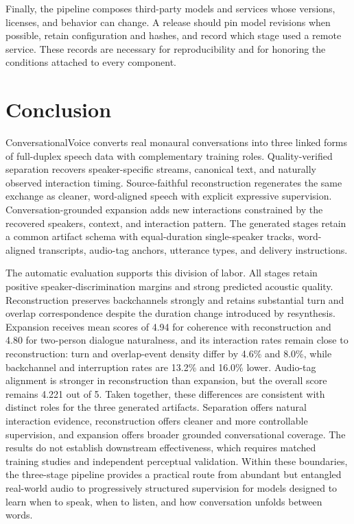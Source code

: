 \documentclass[10pt,twocolumn]{article}
\newcommand{\system}{\textsf{ConversationalVoice}\xspace}
\begin{document}
Finally, the pipeline composes third-party models and services whose versions, licenses, and behavior can change. A release should pin model revisions when possible, retain configuration and hashes, and record which stage used a remote service. These records are necessary for reproducibility and for honoring the conditions attached to every component.

\section{Conclusion}

\system converts real monaural conversations into three linked forms of full-duplex speech data with complementary training roles. Quality-verified separation recovers speaker-specific streams, canonical text, and naturally observed interaction timing. Source-faithful reconstruction regenerates the same exchange as cleaner, word-aligned speech with explicit expressive supervision. Conversation-grounded expansion adds new interactions constrained by the recovered speakers, context, and interaction pattern. The generated stages retain a common artifact schema with equal-duration single-speaker tracks, word-aligned transcripts, audio-tag anchors, utterance types, and delivery instructions.

The automatic evaluation supports this division of labor. All stages retain positive speaker-discrimination margins and strong predicted acoustic quality. Reconstruction preserves backchannels strongly and retains substantial turn and overlap correspondence despite the duration change introduced by resynthesis. Expansion receives mean scores of 4.94 for coherence with reconstruction and 4.80 for two-person dialogue naturalness, and its interaction rates remain close to reconstruction: turn and overlap-event density differ by 4.6\% and 8.0\%, while backchannel and interruption rates are 13.2\% and 16.0\% lower. Audio-tag alignment is stronger in reconstruction than expansion, but the overall score remains 4.221 out of 5. Taken together, these differences are consistent with distinct roles for the three generated artifacts. Separation offers natural interaction evidence, reconstruction offers cleaner and more controllable supervision, and expansion offers broader grounded conversational coverage. The results do not establish downstream effectiveness, which requires matched training studies and independent perceptual validation. Within these boundaries, the three-stage pipeline provides a practical route from abundant but entangled real-world audio to progressively structured supervision for models designed to learn when to speak, when to listen, and how conversation unfolds between words.


\footnotesize

\end{document}
